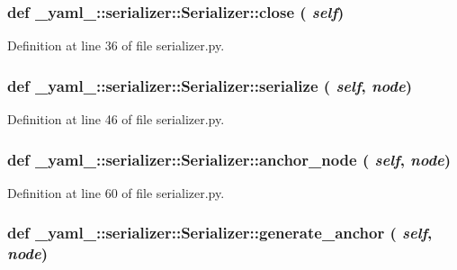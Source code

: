 \subsubsection{\setlength{\rightskip}{0pt plus 5cm}def \_\-yaml\_\-::serializer::Serializer::close ( {\em self})}\label{class__yaml___1_1serializer_1_1Serializer_ea7d2252dd9c1ca8e3b73913d7e12e3f}




Definition at line 36 of file serializer.py.
\subsubsection{\setlength{\rightskip}{0pt plus 5cm}def \_\-yaml\_\-::serializer::Serializer::serialize ( {\em self},  {\em node})}\label{class__yaml___1_1serializer_1_1Serializer_5a3f4272cb9c2d6a744c692f0d723273}




Definition at line 46 of file serializer.py.
\subsubsection{\setlength{\rightskip}{0pt plus 5cm}def \_\-yaml\_\-::serializer::Serializer::anchor\_\-node ( {\em self},  {\em node})}\label{class__yaml___1_1serializer_1_1Serializer_fec0a9121121135ccb62fa1864e14f66}




Definition at line 60 of file serializer.py.
\subsubsection{\setlength{\rightskip}{0pt plus 5cm}def \_\-yaml\_\-::serializer::Serializer::generate\_\-anchor ( {\em self},  {\em node})}\label{class__yaml___1_1serializer_1_1Serializer_02d3da12fdf6f046b7c7b0cc9dafcdbf}




